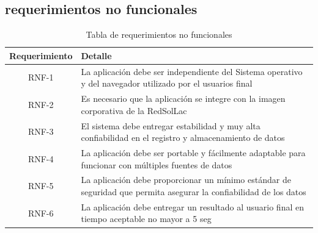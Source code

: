 \subsection{requerimientos no funcionales}
\begin{table}[h!]
\caption{Tabla de requerimientos no funcionales}
\label{tablaNoFuncional}
\begin{tabular}{| c | p{11cm} |}
	\hline
	\textbf{Requerimiento}	&	\textbf{Detalle}	\\
	\hline
	RNF-1	&	La aplicación debe ser independiente del Sistema operativo y del navegador utilizado por el usuarios final	\\
	\hline
	RNF-2	&	Es necesario que la aplicación se integre con la imagen corporativa de la RedSolLac	\\
	\hline
	RNF-3	&	El sistema debe entregar estabilidad y muy alta confiabilidad en el registro y almacenamiento de datos	\\
	\hline
	RNF-4	&	La aplicación debe ser portable y fácilmente adaptable para funcionar con múltiples fuentes de datos 	\\
	\hline
	RNF-5	&	La aplicación debe proporcionar un mínimo estándar de seguridad que permita asegurar la confiabilidad de los datos	\\
	\hline
	RNF-6	&	La aplicación debe entregar un resultado al usuario final en tiempo aceptable no mayor a 5 seg	\\
	\hline
\end{tabular}
\end{table}


